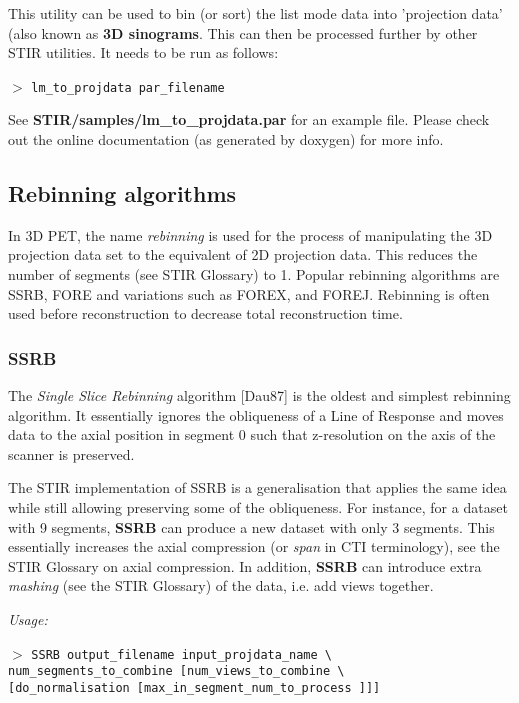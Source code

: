 \documentclass{article}
\newcommand{\cmdline}[1]{\par \noindent $>$ \texttt{#1}\par}
\begin{document}
This utility can be used to bin (or sort) the list mode data 
into 'projection data' (also known as \textbf{3D sinograms}. 
This can then be processed further by other STIR utilities. It 
needs to be run as follows:
\cmdline{lm\_to\_projdata par\_filename}


See \textbf{STIR/samples/lm\_to\_projdata.par} for an example file. Please 
check out the online documentation (as generated by doxygen) 
for more info.


\subsection{
Rebinning algorithms}

In 3D PET, the name \textit{rebinning} is used for the 
process of manipulating the 3D projection data set to the equivalent 
of 2D projection data. This reduces the number of segments (see 
STIR Glossary) to 1. Popular rebinning algorithms are SSRB, FORE 
and variations such as FOREX, and FOREJ. Rebinning is often used 
before reconstruction to decrease total reconstruction time.


\subsubsection{
SSRB}
\label{sec:SSRB}
The \textit{Single Slice Rebinning} algorithm [Dau87] is the oldest 
and simplest rebinning algorithm. It essentially ignores the 
obliqueness of a Line of Response and moves data to the axial 
position in segment 0 such that z-resolution on the axis of the 
scanner is preserved.


The STIR implementation of SSRB is a generalisation that applies 
the same idea while still allowing preserving some of the obliqueness. 
For instance, for a dataset with 9 segments, \textbf{SSRB} can produce 
a new dataset with only 3 segments. This essentially increases 
the axial compression (or \textit{span} in CTI terminology), see the 
STIR Glossary on axial compression. In addition, \textbf{SSRB} can 
introduce extra \textit{mashing} (see the STIR Glossary) of the data, 
i.e. add views together.


\textit{Usage:}
\cmdline{SSRB output\_filename input\_projdata\_name {\textbackslash} \\
num\_segments\_to\_combine [num\_views\_to\_combine {\textbackslash}\\
{[}do\_normalisation [max\_in\_segment\_num\_to\_process ]]]}
\end{document}
